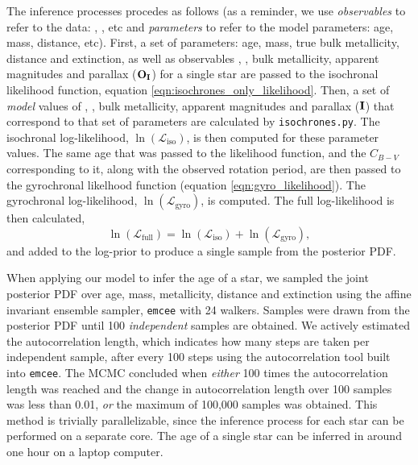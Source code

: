 The inference processes procedes as follows (as a reminder, we use {\it
observables} to refer to the data: \teff, \logg, etc and {\it parameters} to
refer to the model parameters: age, mass, distance, etc).
First, a set of parameters: age, mass, true bulk metallicity, distance and
extinction, as well as observables \teff, \logg, bulk metallicity, apparent
magnitudes and parallax (${\bf O_I}$) for a single star are passed to the
isochronal likelihood function, equation
\eqref{eqn:isochrones_only_likelihood}.
Then, a set of {\it model} values of \teff, \logg, bulk metallicity, apparent
magnitudes and parallax (${\bf I}$) that correspond to that set of parameters
are calculated by {\tt isochrones.py}.
The isochronal log-likelihood, $\ln(\mathcal{L}_{\mathrm{iso}})$, is then
computed for these parameter values.
The same age that was passed to the likelihood function, and the $C_{B-V}$
corresponding to it, along with the observed rotation period, are then passed
to the gyrochronal likelhood function (equation \ref{eqn:gyro_likelihood}).
The gyrochronal log-likelihood, $\ln(\mathcal{L}_{\mathrm{gyro}})$, is
computed.
The full log-likelihood is then calculated,
\begin{equation} \label{eqn:both_likelihood}
\ln(\mathcal{L}_{\mathrm{full}})
= \ln(\mathcal{L}_{\mathrm{iso}}) + \ln(\mathcal{L}_{\mathrm{gyro}}),
\end{equation}
and added to the log-prior to produce a single sample from the posterior PDF.

When applying our model to infer the age of a star, we sampled the joint
posterior PDF over age, mass, metallicity, distance and extinction using the
affine invariant ensemble sampler, {\tt emcee} \citep{foreman-mackey2013} with
24 walkers.
Samples were drawn from the posterior PDF until 100 {\it independent} samples
are obtained.
We actively estimated the autocorrelation length, which indicates how many
steps are taken per independent sample, after every 100 steps using the
autocorrelation tool built into {\tt emcee}.
The MCMC concluded when {\it either} 100 times the autocorrelation length was
reached and the change in autocorrelation length over 100 samples was less
than 0.01, {\it or} the maximum of 100,000 samples was obtained.
This method is trivially parallelizable, since the inference process for each
star can be performed on a separate core.
The age of a single star can be inferred in around one hour on a laptop
computer.

